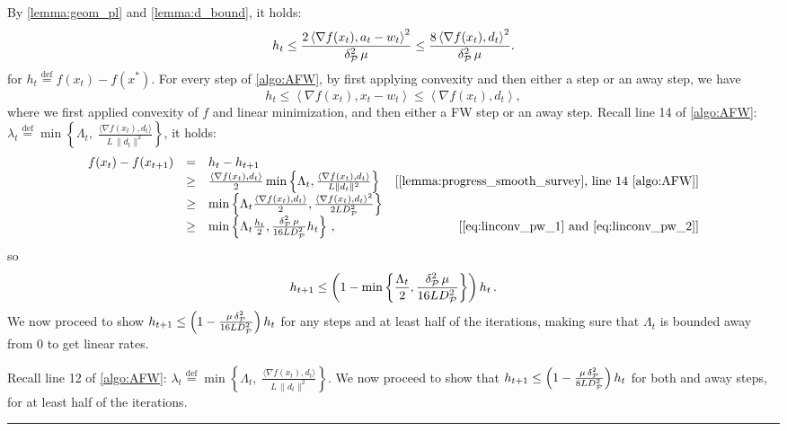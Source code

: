\documentclass[twoside]{article}
\newcommand{\jmlrBlackBox}{\rule{1.5ex}{1.5ex}}
\newcommand{\jmlrQED}{\hfill\jmlrBlackBox\par\bigskip}
\providecommand{\proofname}{Proof}
\renewenvironment{proof}{\par\noindent{\bfseries\upshape \proofname\ }}{\jmlrQED}
\newcommand{\mP}{\mathcal{P}}
\newcommand{\innp}[1]{\left\langle #1 \right\rangle}
\newcommand{\defi}{\stackrel{\mathrm{\scriptscriptstyle def}}{=}}
\begin{document}
\begin{proof}
By \cref{lemma:geom_pl} and \cref{lemma:d_bound}, it holds:
\begin{equation}\label{eq:linconv_pw_1}
h_t \le \frac{2\innp{\nabla f(x_t), a_t - w_t}^2}{\pw[2]{\mP}\mu} \le \frac{8\innp{\nabla f(x_t), d_t}^2}{\pw[2]{\mP}\mu}.
\end{equation}
for $h_t \defi f(x_t)-f(x^\ast)$. For every step of \cref{algo:AFW}, by first applying convexity and then either a \FW{} step or an away step, we have 
\begin{equation}\label{eq:linconv_pw_2}
h_t \le \innp{\nabla f(x_t), x_t - w_t} \le \innp{\nabla f(x_t), d_t},
\end{equation}
where we first applied convexity of $f$ and linear minimization, and then either a FW step or an away step.
%
Recall line 14 of \cref{algo:AFW}: $\lambda_t \defi \min\left\{ \Lambda_t,\; \frac{\langle \nabla f(x_t), d_t \rangle}{L\,\|d_t\|^2} \right\}$, it holds:
\begin{equation}\label{eq:linconv_pw_3}
\begin{array}{rclr}
f(x_t) - f(x_{t+1}) &=& h_t - h_{t+1}\\
&\ge& \frac{\innp{\nabla f(x_t), d_t}}{2} \min \left\{ \Lambda_t, \frac{\innp{\nabla f(x_t), d_t}}{L\|d_t\|^2}\right\} &[\text{\cref{lemma:progress_smooth_survey}, line 14 \cref{algo:AFW}}]\\
%
&\ge & \min \left\{ \Lambda_t \frac{\innp{\nabla f(x_t), d_t}}{2}, \frac{\innp{\nabla f(x_t), d_t}^2}{2L\diam[2]{\mP}}\right\}&\\
%
&\ge & \min \left\{\Lambda_t \frac{h_t}{2}, \frac{\pw[2]{\mP}\mu}{16L\diam[2]{\mP}}h_t\right\}\,, & [\text{\cref{eq:linconv_pw_1} and \cref{eq:linconv_pw_2}}]
\end{array}
\end{equation}
so
\begin{equation}\label{eq:linconv_pw_4}
h_{t+1} \le \left(1 - \min \left\{\frac{\Lambda_t}{2}, \frac{\pw[2]{\mP}\mu}{16L\diam[2]{\mP}}\right\}\right)h_t\,.
\end{equation}
%
We now proceed to show $h_{t+1} \le \left(1 - \frac{\mu\pw[2]{\mP}}{16L\diam[2]{\mP}}\right)h_t$ for any steps and at least half of the iterations, making sure that $\Lambda_t$ is bounded away from 0 to get linear rates. 

Recall line 12 of \cref{algo:AFW}: $\lambda_t \defi \min\left\{ \Lambda_t,\; \frac{\langle \nabla f(x_t), d_t \rangle}{L\,\|d_t\|^2} \right\}$.
We now proceed to show that $h_{t+1} \le \left(1 - \frac{\mu\pw[2]{\mP}}{8L\diam[2]{\mP}}\right)h_t$ for both \FW{} and away steps, for at least half of the iterations.


\end{proof}
\end{document}
